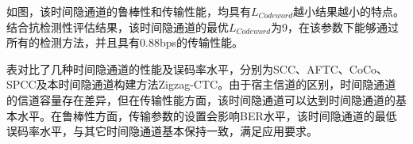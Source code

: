 如图，该时间隐通道的鲁棒性和传输性能，均具有$L_{Codeword}$越小结果越小的特点。结合抗检测性评估结果，该时间隐通道的最优$L_{Codeword}$为9，在该参数下能够通过所有的检测方法，并且具有0.88bps的传输性能。

表对比了几种时间隐通道的性能及误码率水平，分别为SCC、AFTC、CoCo、SPCC及本时间隐通道构建方法Zigzag-CTC。由于宿主信道的区别，时间隐通道的信道容量存在差异，但在传输性能方面，该时间隐通道可以达到时间隐通道的基本水平。在鲁棒性方面，传输参数的设置会影响BER水平，该时间隐通道的最低误码率水平，与其它时间隐通道基本保持一致，满足应用要求。